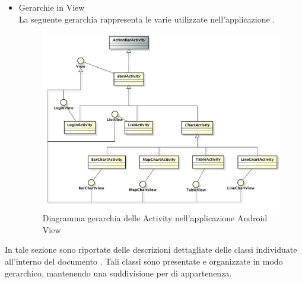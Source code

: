 \begin{itemize}
\begin{figure}[H]
                    \end{figure}
                \item Gerarchie in View \\
                    La seguente gerarchia rappresenta le varie  utilizzate nell'applicazione .
                    \begin{figure}[H]
                        \centering
                        \includegraphics[width=1\textwidth]{DefinizioneDiProdotto/Pics/Gerarchie/ApplicazioneActivity.pdf}
                        \caption{Diagramma gerarchia delle Activity nell'applicazione Android View}
                    \end{figure}
		
            \end{itemize}
        In tale sezione sono riportate delle descrizioni dettagliate delle classi individuate all'interno del documento . Tali classi sono presentate e organizzate in modo gerarchico, mantenendo una suddivisione per  di appartenenza.
        
        

